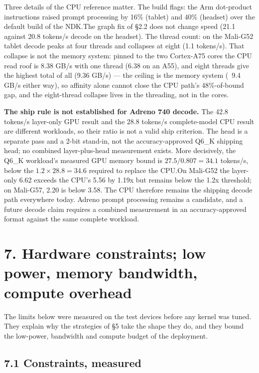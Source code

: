 \documentclass[
  10pt,
]{article}
\begin{document}
Three details of the CPU reference matter. The build flags: the Arm
dot-product instructions raised prompt processing by 16\% (tablet) and
40\% (headset) over the default build of the NDK.\@ The graph fix of \S{}2.2
does not change speed (21.1 against 20.8 tokens/s decode on the
headset). The thread count: on the Mali-G52 tablet decode peaks at four
threads and collapses at eight (1.1 tokens/s). That collapse is not the
memory system: pinned to the two Cortex-A75 cores the CPU read roof is
8.38 GB/s with one thread (6.38 on an A55), and eight threads give the
highest total of all (9.36 GB/s) --- the ceiling is the memory system
(~9.4 GB/s either way), so affinity alone cannot close the CPU path's
48\%-of-bound gap, and the eight-thread collapse lives in the threading,
not in the cores.

\textbf{The ship rule is not established for Adreno 740 decode.} The
42.8 tokens/s layer-only GPU result and the 28.8 tokens/s complete-model
CPU result are different workloads, so their ratio is not a valid ship
criterion. The head is a separate pass and a 2-bit stand-in, not the
accuracy-approved Q6\_K shipping head; no combined layer-plus-head
measurement exists. More decisively, the Q6\_K workload's measured GPU
memory bound is $27.5/0.807 = 34.1$ tokens/s, below the
$1.2 \times 28.8 = 34.6$ required to replace the CPU.\@ On Mali-G52 the
layer-only 6.62 exceeds the CPU's 5.56 by 1.19x but remains below the
1.2x threshold; on Mali-G57, 2.20 is below 3.58. The CPU therefore
remains the shipping decode path everywhere today. Adreno prompt
processing remains a candidate, and a future decode claim requires a
combined measurement in an accuracy-approved format against the same
complete workload.

\section{7. Hardware constraints; low power, memory bandwidth, compute
overhead}\label{hardware-constraints-low-power-memory-bandwidth-compute-overhead}

The limits below were measured on the test devices before any kernel
was tuned. They explain why the strategies of \S{}5 take the shape they
do, and they bound the low-power, bandwidth and compute budget of the
deployment.

\subsection{7.1 Constraints, measured}\label{constraints-measured}
\end{document}
